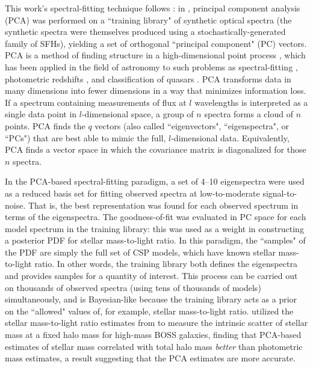 This work's spectral-fitting technique follows \citet[][hereafter ]{chen_pca}: in , principal component analysis (PCA) was performed on a ``training library" of synthetic optical spectra (the synthetic spectra were themselves produced using a stochastically-generated family of SFHs), yielding a set of orthogonal ``principal component" (PC) vectors. PCA is a method of finding structure in a high-dimensional point process \citep{jolliffe_1986_pca}, which has been applied in the field of astronomy to such problems as spectral-fitting \citep{budavari_09}, photometric redshifts \citep{cabanac_02}, and classification of quasars \citep{yip_connolly_04, suzuki_06}. PCA transforms data in many dimensions into fewer dimensions in a way that minimizes information loss. If a spectrum containing measurements of flux at $l$ wavelengths is interpreted as a single data point in $l$-dimensional space, a group of $n$ spectra forms a cloud of $n$ points. PCA finds the $q$ vectors (also called ``eigenvectors", ``eigenspectra", or ``PCs") that are best able to mimic the full, $l$-dimensional data. Equivalently, PCA finds a vector space in which the covariance matrix is diagonalized for those $n$ spectra.

In the PCA-based spectral-fitting paradigm, a set of 4--10 eigenspectra were used as a reduced basis set for fitting observed spectra at low-to-moderate signal-to-noise. That is, the best representation was found for each observed spectrum in terms of the eigenspectra. The goodness-of-fit was evaluated in PC space for each model spectrum in the training library: this was used as a weight in constructing a posterior PDF for stellar mass-to-light ratio. In this paradigm, the ``samples" of the PDF are simply the full set of CSP models, which have known stellar mass-to-light ratio. In other words, the training library both defines the eigenspectra and provides samples for a quantity of interest. This process can be carried out on thousands of observed spectra (using tens of thousands of models) simultaneously, and is Bayesian-like because the training library acts as a prior on the ``allowed" values of, for example, stellar mass-to-light ratio. \citet{tinker_mstar} utilized the stellar mass-to-light ratio estimates from  to measure the intrinsic scatter of stellar mass at a fixed halo mass for high-mass BOSS galaxies, finding that PCA-based estimates of stellar mass correlated with total halo mass \emph{better} than photometric mass estimates, a result suggesting that the PCA estimates are more accurate.

